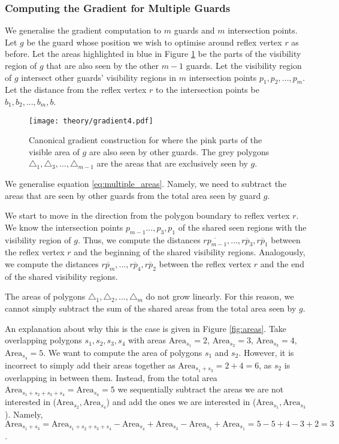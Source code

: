 \subsubsection{Computing the Gradient for Multiple Guards}
We generalise the gradient computation to $m$ guards and $m$ intersection points. Let $g$ be the guard whose position we wish to optimise around reflex vertex $r$ as before. Let the areas highlighted in blue in Figure \ref{fig:general_gradient} be the parts of the visibility region of $g$ that are also seen by the other $m - 1$ guards. Let the visibility region of $g$ intersect other guards' visibility regions in $m$ intersection points $p_1, p_2, ..., p_m$. Let the distance from the reflex vertex $r$ to the intersection points be $b_{1}, b_{2}, ..., b_{m}, b$.

\begin{figure}[h!]
    \centering
    \texttt{[image: theory/gradient4.pdf]}
    \caption{Canonical gradient construction for where the pink parts of the visible area of $g$ are also seen by other guards. The grey polygons $\triangle_1, \triangle_3, ..., \triangle_{m - 1}$ are the areas that are exclusively seen by $g$.}
    \label{fig:general_gradient} 
\end{figure}

We generalise equation \ref{eq:multiple_areas}. Namely, we need to subtract the areas that are seen by other guards from the total area seen by guard $g$. 

We start to move in the direction from the polygon boundary to reflex vertex $r$. We know the intersection points $p_{m - 1} ..., p_3, p_1$ of the shared seen regions with the visibility region of $g$. Thus, we  compute the distances $\overline{rp_{m - 1}}, ..., \overline{rp_3}, \overline{rp_1}$ between the reflex vertex $r$ and the beginning of the shared visibility regions. Analogously, we  compute the distances $\overline{rp_m}, ...,  \overline{rp_4}, \overline{rp_2}$ between the reflex vertex $r$ and the end of the shared visibility regions.

The areas of polygons $\triangle_1, \triangle_2, ..., \triangle_m$ do not grow linearly. For this reason, we cannot simply subtract the sum of the shared areas from the total area seen by $g$. 

An explanation about why this is the case is given in Figure \ref{fig:areas}. Take overlapping polygons $s_1, s_2, s_3, s_4$ with areas $\text{Area}_{s_1} = 2$, $\text{Area}_{s_2} = 3$, $\text{Area}_{s_3} = 4$, $\text{Area}_{s_4} = 5$. We want to compute the area of polygons $s_1$ and $s_2$. However, it is incorrect to simply add their areas together as $\text{Area}_{s_1 + s_3} = 2 + 4 = 6$, as $s_2$ is overlapping in between them. Instead, from the total area $\text{Area}_{s_1 + s_2 + s_3 + s_4} = \text{Area}_{s_4} = 5$ we  sequentially subtract the areas we are not interested in ($\text{Area}_{s_2}, \text{Area}_{s_4}$) and add the ones we are interested in ($\text{Area}_{s_1}, \text{Area}_{s_3}$). Namely, $\text{Area}_{s_1 + s_3} = \text{Area}_{s_1 + s_2 + s_3 + s_4} - \text{Area}_{s_4} + \text{Area}_{s_3} - \text{Area}_{s_2} + \text{Area}_{s_1} = 5 - 5 + 4 - 3 + 2 = 3$.

